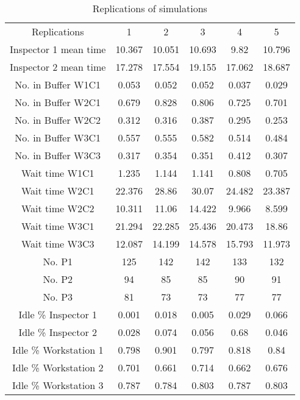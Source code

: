 \documentclass{article}
\begin{document}
\begin{table}[htp]
\caption{Replications of simulations}
\begin{center}
\begin{tabular}{cccccc}
\hline
Replications & 1 & 2 & 3 & 4 & 5\\
Inspector 1 mean time&10.367&10.051&10.693&9.82&10.796\\
Inspector 2 mean time&17.278&17.554&19.155&17.062&18.687\\
No. in Buffer W1C1&0.053&0.052&0.052&0.037&0.029\\
No. in Buffer W2C1&0.679&0.828&0.806&0.725&0.701\\
No. in Buffer W2C2&0.312&0.316&0.387&0.295&0.253\\
No. in Buffer W3C1&0.557&0.555&0.582&0.514&0.484\\
No. in Buffer W3C3&0.317&0.354&0.351&0.412&0.307\\
Wait time W1C1&1.235&1.144&1.141&0.808&0.705\\
Wait time W2C1&22.376&28.86&30.07&24.482&23.387\\
Wait time W2C2&10.311&11.06&14.422&9.966&8.599\\
Wait time W3C1&21.294&22.285&25.436&20.473&18.86\\
Wait time W3C3&12.087&14.199&14.578&15.793&11.973\\
No. P1&125&142&142&133&132\\
No. P2&94&85&85&90&91\\
No. P3&81&73&73&77&77\\
Idle \% Inspector 1&0.001&0.018&0.005&0.029&0.066\\
Idle \% Inspector 2&0.028&0.074&0.056&0.68&0.046\\
Idle \% Workstation 1&0.798&0.901&0.797&0.818&0.84\\
Idle \% Workstation 2&0.701&0.661&0.714&0.662&0.676\\
Idle \% Workstation 3&0.787&0.784&0.803&0.787&0.803\\
\hline


\end{tabular}




\end{center}
\end{table}
\end{document}

